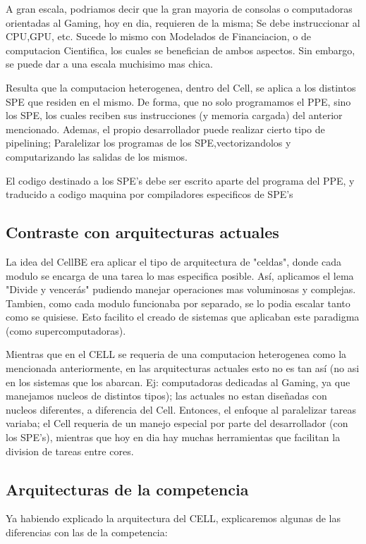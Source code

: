 \documentclass[10pt,compsoc]{IEEEtran}
\begin{document}
	A gran escala, podriamos decir que la gran mayoria de consolas o computadoras orientadas al Gaming, hoy en dia, requieren de la misma; Se debe instruccionar al CPU,GPU, etc. Sucede lo mismo con Modelados de Financiacion, o de computacion Cientifica, los cuales se benefician de ambos aspectos. Sin embargo, se puede dar a una escala muchisimo mas chica.\newline
	
	 Resulta que la computacion heterogenea, dentro del Cell, se aplica a los distintos SPE que residen en el mismo. De forma, que no solo programamos el PPE, sino los SPE, los cuales reciben sus instrucciones (y memoria cargada) del anterior mencionado. Ademas, el propio desarrollador puede realizar cierto tipo de pipelining; Paralelizar los programas de los SPE,vectorizandolos y computarizando las salidas de los mismos.\newline
	 
	 El codigo destinado a los SPE's debe ser escrito aparte del programa del PPE, y traducido a codigo maquina por compiladores especificos de SPE's
	
	\subsection{Contraste con arquitecturas actuales}
	\noindent La idea del CellBE era aplicar el tipo de arquitectura de "celdas", donde cada modulo se encarga de una tarea lo mas especifica posible. Así, aplicamos el lema "Divide y vencerás" pudiendo manejar operaciones mas voluminosas y complejas. Tambien, como cada modulo funcionaba por separado, se lo podia escalar tanto como se quisiese. Esto facilito el creado de sistemas que aplicaban este paradigma (como supercomputadoras).\newline
	
	 Mientras que en el CELL se requeria de una computacion heterogenea como la mencionada anteriormente, en las arquitecturas actuales esto no es tan así (no asi en los sistemas que los abarcan. Ej: computadoras dedicadas al Gaming, ya que manejamos nucleos de distintos tipos); las actuales no estan diseñadas con nucleos diferentes, a diferencia del Cell. Entonces, el enfoque al paralelizar tareas variaba; el Cell requeria de un manejo especial por parte del desarrollador (con los SPE's), mientras que hoy en dia hay muchas herramientas que facilitan la division de tareas entre cores.
	
	\subsection{Arquitecturas de la competencia}%
	\noindent Ya habiendo explicado la arquitectura del CELL, explicaremos algunas de las diferencias con las de la competencia:
	
\end{document}

